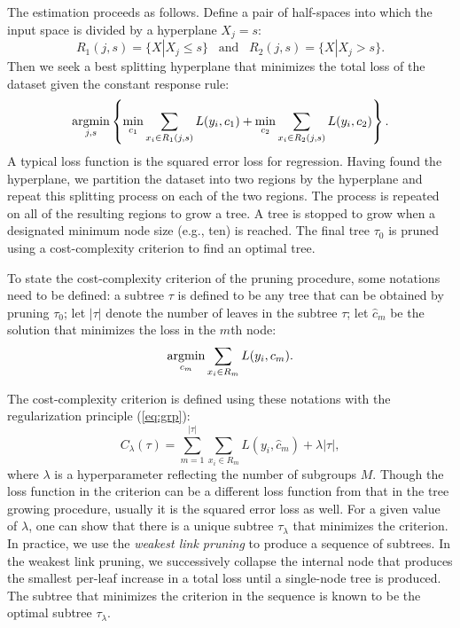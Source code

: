 \documentclass[12pt]{article}
\newcommand{\argmin}{\mathop{\rm argmin}\limits}
\begin{document}
The estimation proceeds as follows. Define a pair of half-spaces into which the input space is divided by a hyperplane $X_j = s$:
\begin{equation*}
R_1(j,s) = \{X|X_j \leq s\} \hspace{10pt} \text{and} \hspace{10pt} R_2(j,s) = \{X|X_j > s\}.
\end{equation*}
Then we seek a best splitting hyperplane that minimizes the total loss of the dataset given the constant response rule:
\begin{equation*}
\argmin_{j,s} \left\{\min_{c_1} \sum_{x_i \in R_1(j,s)} L(y_i,c_1) + \min_{c_2} \sum_{x_i \in R_2(j,s)} L(y_i,c_2)\right\}.
\end{equation*}
A typical loss function is the squared error loss for regression. Having found the hyperplane, we partition the dataset into two regions by the hyperplane and repeat this splitting process on each of the two regions. The process is repeated on all of the resulting regions to grow a tree. A tree is stopped to grow when a designated minimum node size (e.g., ten) is reached. The final tree $\tau_0$ is pruned using a cost-complexity criterion to find an optimal tree.

To state the cost-complexity criterion of the pruning procedure, some notations need to be defined: a subtree $\tau$ is defined to be any tree that can be obtained by pruning $\tau_0$; let $|\tau|$ denote the number of leaves in the subtree $\tau$; let $\hat{c}_m$ be the solution that minimizes the loss in the $m$th node:
\begin{equation*}
\argmin_{c_m} \sum_{x_i \in R_m} L(y_i,c_m).
\end{equation*}

The cost-complexity criterion is defined using these notations with the regularization principle (\ref{eq:grp}):
\begin{equation*}
C_{\lambda}(\tau) = \sum_{m=1}^{|\tau|} \sum_{x_i \in R_m} L(y_i,\hat{c}_m) + \lambda |\tau|,
\end{equation*}
where $\lambda$ is a hyperparameter reflecting the number of subgroups $M$. Though the loss function in the criterion can be a different loss function from that in the tree growing procedure, usually it is the squared error loss as well. For a given value of $\lambda$, one can show that there is a unique subtree $\tau_{\lambda}$ that minimizes the criterion. In practice, we use the {\it weakest link pruning} to produce a sequence of subtrees. In the weakest link pruning, we successively collapse the internal node that produces the smallest per-leaf increase in a total loss until a single-node tree is produced. The subtree that minimizes the criterion in the sequence is known to be the optimal subtree $\tau_{\lambda}$.
\end{document}
